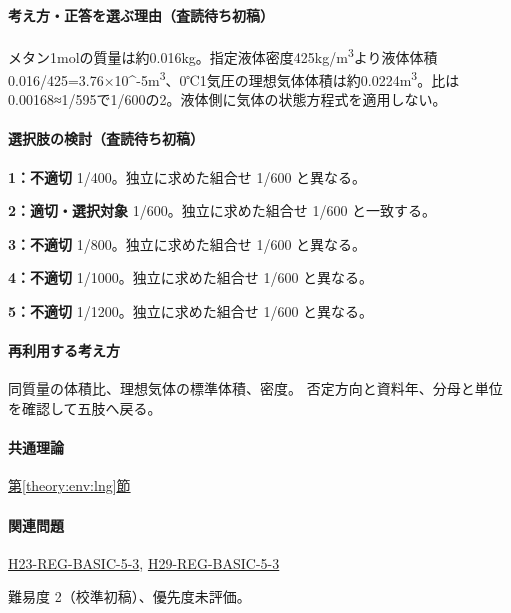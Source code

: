 \paragraph{考え方・正答を選ぶ理由（査読待ち初稿）} メタン1molの質量は約0.016kg。指定液体密度425kg/m\textsuperscript{3}より液体体積0.016/425=\allowbreak{}3.76×10\textasciicircum{}-5m\textsuperscript{3}、0℃1気圧の理想気体体積は約0.0224m\textsuperscript{3}。比は0.00168≈1/595で1/600の2。液体側に気体の状態方程式を適用しない。

\paragraph{選択肢の検討（査読待ち初稿）}\mbox{}\par

\noindent\textbf{1：不適切} 1/400。独立に求めた組合せ 1/600 と異なる。\par

\noindent\textbf{2：適切・選択対象} 1/600。独立に求めた組合せ 1/600 と一致する。\par

\noindent\textbf{3：不適切} 1/800。独立に求めた組合せ 1/600 と異なる。\par

\noindent\textbf{4：不適切} 1/1000。独立に求めた組合せ 1/600 と異なる。\par

\noindent\textbf{5：不適切} 1/1200。独立に求めた組合せ 1/600 と異なる。\par

\paragraph{再利用する考え方} 同質量の体積比、理想気体の標準体積、密度。 否定方向と資料年、分母と単位を確認して五肢へ戻る。

\paragraph{共通理論} \hyperref[theory:env:lng]{第\ref*{theory:env:lng}節}

\paragraph{関連問題} \hyperref[q:h23-reg-basic-5-3]{H23-REG-BASIC-5-3}, \hyperref[q:h29-reg-basic-5-3]{H29-REG-BASIC-5-3}

\par 難易度 2（校準初稿）、優先度未評価。

